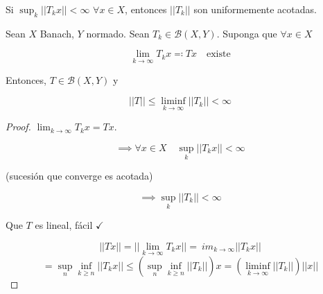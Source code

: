 \begin{fnote}
    Si $\sup_k ||T_k x||<\infty$ $\forall x\in X$, entonces $||T_k||$ son uniformemente acotadas.
\end{fnote}

\begin{fcorollary}
    Sean $X$ Banach, $Y$ normado. Sean $T_k\in\mathcal{B}(X,Y)$. Suponga que $\forall x\in X$

    \[\lim_{k\to\infty} T_k x\eqqcolon Tx\quad \text{existe}\]

    Entonces, $T\in \mathcal{B}(X,Y)$ y 

    \[||T||\leq \liminf_{k\to\infty} ||T_k||<\infty\]
\end{fcorollary}

\begin{proof}
    $\lim_{k\to\infty} T_k x=Tx$.

    \[\implies \forall x\in X\quad \sup_k ||T_k x||<\infty\]

    (sucesión que converge es acotada)

    \[\implies \sup_k ||T_k||<\infty\]

    Que $T$ es lineal, fácil $\checkmark$

    \[||Tx||=||\lim_{k\to\infty}T_k x||=\ im_{k\to\infty} ||T_k x||\]
    \[=\sup_n\inf_{k\geq n}||T_k x||\leq (\sup_n\inf_{k\geq n} ||T_k||)x=(\liminf_{k\to\infty} ||T_k||)||x||\]

\end{proof}

